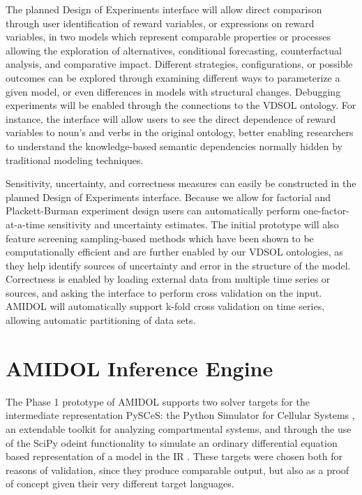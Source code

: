 \documentclass[11pt]{article}
\newcommand{\amidol}{\textsc{AMIDOL}}
\begin{document}
The planned Design of Experiments interface will allow direct comparison through user identification of reward variables, or expressions on reward variables, in two models which represent comparable properties or processes allowing the exploration of alternatives, conditional forecasting, counterfactual analysis, and comparative impact.  Different strategies, configurations, or possible outcomes can be explored through examining different ways to parameterize a given model, or even differences in models with structural changes.  Debugging experiments will be enabled through the connections to the VDSOL ontology.  For instance, the interface will allow users to see the direct dependence of reward variables to noun's and verbs in the original ontology, better enabling researchers to understand the knowledge-based semantic dependencies normally hidden by traditional modeling techniques.

Sensitivity, uncertainty, and correctness measures can easily be constructed in the planned Design of Experiments interface.  Because we allow for factorial and Plackett-Burman experiment design users can automatically perform one-factor-at-a-time \cite{bailis2005mortality,murphy2004quantification} sensitivity and uncertainty estimates.  The initial prototype will also feature screening sampling-based methods \cite{morris1991factorial} which have been shown to be computationally efficient and are further enabled by our VDSOL ontologies, as they help identify sources of uncertainty and error in the structure of the model.  Correctness is enabled by loading external data from multiple time series or sources, and asking the interface to perform cross validation on the input.  \amidol{} will automatically support k-fold cross validation on time series, allowing automatic partitioning of data sets.

\section{\amidol{} Inference Engine}

The Phase 1 prototype of \amidol{} supports two solver targets for the intermediate representation PySCeS: the Python Simulator for Cellular Systems \cite{olivier2011pysces,olivier2005modelling}, an extendable toolkit for analyzing compartmental systems, and through the use of the SciPy odeint functionality to simulate an ordinary differential equation based representation of a model in the IR \cite{oliphant2004scipy,ahnert2011odeint}.  These targets were chosen both for reasons of validation, since they produce comparable output, but also as a proof of concept given their very different target languages.
\end{document}
